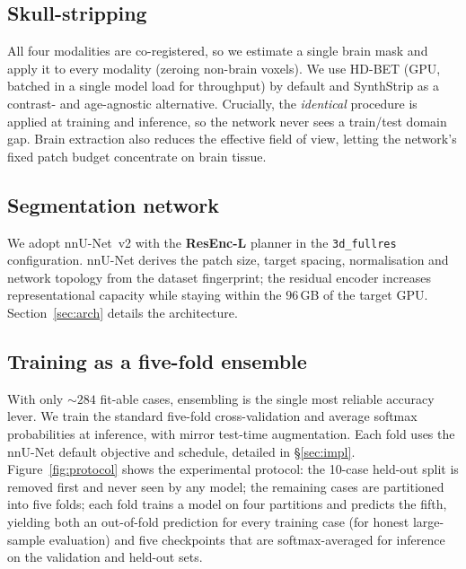 \documentclass[11pt,a4paper]{article}
\begin{document}
\subsection{Skull-stripping}
All four modalities are co-registered, so we estimate a single brain mask and apply
it to every modality (zeroing non-brain voxels). We use HD-BET (GPU, batched in a
single model load for throughput) by default and SynthStrip as a contrast- and
age-agnostic alternative. Crucially, the \emph{identical} procedure is applied at
training and inference, so the network never sees a train/test domain gap. Brain
extraction also reduces the effective field of view, letting the network's fixed
patch budget concentrate on brain tissue.

\subsection{Segmentation network}
We adopt nnU-Net~v2 with the \textbf{ResEnc-L} planner in the \texttt{3d\_fullres}
configuration. nnU-Net derives the patch size, target spacing, normalisation and
network topology from the dataset fingerprint; the residual encoder increases
representational capacity while staying within the $96\,$GB of the target GPU.
Section~\ref{sec:arch} details the architecture.

\subsection{Training as a five-fold ensemble}
With only $\sim\!284$ fit-able cases, ensembling is the single most reliable accuracy
lever. We train the standard five-fold cross-validation and average softmax
probabilities at inference, with mirror test-time augmentation. Each fold uses the
nnU-Net default objective and schedule, detailed in \S\ref{sec:impl}.
Figure~\ref{fig:protocol} shows the experimental protocol: the 10-case held-out split
is removed first and never seen by any model; the remaining cases are partitioned into
five folds; each fold trains a model on four partitions and predicts the fifth,
yielding both an out-of-fold prediction for every training case (for honest
large-sample evaluation) and five checkpoints that are softmax-averaged for inference
on the validation and held-out sets.
\end{document}
